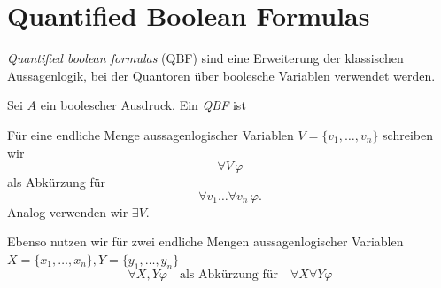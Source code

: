 \section{Quantified Boolean Formulas}
\label{sec:qbf}
      \emph{Quantified boolean formulas} (QBF) sind eine Erweiterung der klassischen Aussagenlogik, 
      bei der Quantoren über boolesche Variablen verwendet werden.
      \begin{Definition}
      \label{def:qbf}
      Sei $A$ ein boolescher Ausdruck. Ein \emph{QBF} ist 
      \end{Definition}

      Für eine endliche Menge aussagenlogischer Variablen
      \(V=\{v_1,\dots,v_n\}\) schreiben wir
      \[
      \forall V\,\varphi
      \]
      als Abkürzung für
      \[
      \forall v_1\dots \forall v_n\,\varphi.
      \]
      Analog verwenden wir \(\exists V\).

      Ebenso nutzen wir für zwei endliche Mengen aussagenlogischer Variablen $X=\{x_1,\dots,x_n\}, Y=\{y_1,\ldots,y_n\}$
      \[
      \forall X,Y \varphi
      \quad \text{als Abkürzung für}\quad
      \forall X \forall Y \varphi
      \]
\newpage